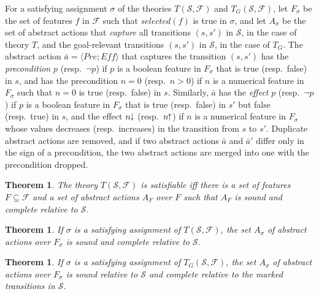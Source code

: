 \documentclass[letterpaper]{article} %
\newcommand{\tup}[1]{\langle #1 \rangle}
\newtheorem{theorem}[definition]{Theorem}
\newcommand{\F}{\mathcal{F}}
\renewcommand{\S}{\mathcal{S}}
\newcommand{\Eff}{{\mathit{Eff}}}
\newcommand{\abst}[2]{\tup{#1;#2}}
\newcommand{\pplus}{\hspace{-.05em}\raisebox{.15ex}{\footnotesize$\uparrow$}}
\newcommand{\mminus}{\hspace{-.05em}\raisebox{.15ex}{\footnotesize$\downarrow$}}
\begin{document}
For a satisfying assignment $\sigma$ of the theories $T(\S,\F)$ and $T_G(\S,\F)$, let
$F_{\sigma}$ be the set of features $f$ in $\F$ such that $selected(f)$
is true in $\sigma$, and let $A_{\sigma}$ be the set of abstract actions
that \emph{capture} all transitions $(s,s')$ in $\S$, in the case of theory $T$,
and the goal-relevant transitions $(s,s')$ in $\S$, in the case of $T_G$.
The abstract action $\bar{a}=\abst{Pre}{\Eff}$ that captures the transition $(s,s')$
has the \emph{precondition} $p$ (resp.\ $\neg p$) if $p$ is a boolean feature in
$F_{\sigma}$ that is true (resp.\ false) in $s$, and has the precondition $n=0$
(resp.\ $n > 0$) if $n$ is a numerical feature in $F_{\sigma}$ such that $n=0$
is true (resp.\ false) in $s$. Similarly, $\bar{a}$ has the \emph{effect} $p$
(resp.\ $\neg p$) if $p$ is a boolean feature in $F_{\sigma}$ that is true
(resp.\ false) in $s'$ but false (resp.\ true) in $s$, and the effect $n\mminus$
(resp.\ $n\pplus$) if $n$ is a numerical feature in $F_{\sigma}$ whose values
decreases (resp.\ increases) in the transition from $s$ to $s'$.
Duplicate abstract actions are removed, and if two abstract actions $\bar{a}$ and $\bar{a}'$
differ only in the sign of a precondition, the two abstract actions are    merged into one with
the precondition dropped.

\begin{theorem}
  The theory $T(\S,\F)$ is satisfiable iff there is a set of features $F \subseteq \F$
  and a set of abstract actions $A_F$ over $F$ such that $A_F$ is sound and complete relative to  $\S$.
\end{theorem}

\begin{theorem}
  If $\sigma$ is a satisfying assignment of $T(\S,\F)$, the set $A_{\sigma}$ of abstract actions over $F_{\sigma}$ is sound and complete relative to $\S$.
\end{theorem}

\begin{theorem}
  If $\sigma$ is a satisfying assignment of $T_G(\S,\F)$, the set $A_{\sigma}$ of abstract actions over $F_{\sigma}$ is sound relative to $\S$ and complete relative to the marked transitions in $\S$.
\end{theorem}
\end{document}

